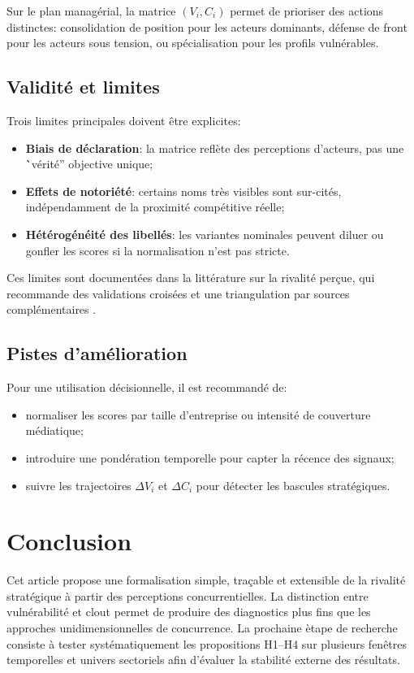 \documentclass[11pt,a4paper]{article}
\begin{document}
Sur le plan manag\'erial, la matrice $(V_i, C_i)$ permet de prioriser des actions distinctes: consolidation de position pour les acteurs dominants, d\'efense de front pour les acteurs sous tension, ou sp\'ecialisation pour les profils vuln\'erables.

\subsection*{Validit\'e et limites}
Trois limites principales doivent \^etre explicites:
\begin{itemize}
    \item \textbf{Biais de d\'eclaration}: la matrice refl\`ete des perceptions d'acteurs, pas une \``v\'erit\'e'' objective unique;
    \item \textbf{Effets de notori\'et\'e}: certains noms tr\`es visibles sont sur-cit\'es, ind\'ependamment de la proximit\'e comp\'etitive r\'eelle;
    \item \textbf{H\'et\'erog\'en\'eit\'e des libell\'es}: les variantes nominales peuvent diluer ou gonfler les scores si la normalisation n'est pas stricte.
\end{itemize}

Ces limites sont document\'ees dans la litt\'erature sur la rivalit\'e per\c cue, qui recommande des validations crois\'ees et une triangulation par sources compl\'ementaires \citep{kilduff2010,porter2008}.

\subsection*{Pistes d'am\'elioration}
Pour une utilisation d\'ecisionnelle, il est recommand\'e de:
\begin{itemize}
    \item normaliser les scores par taille d'entreprise ou intensit\'e de couverture m\'ediatique;
    \item introduire une pond\'eration temporelle pour capter la r\'ecence des signaux;
    \item suivre les trajectoires $\Delta V_i$ et $\Delta C_i$ pour d\'etecter les bascules strat\'egiques.
\end{itemize}

\section{Conclusion}
Cet article propose une formalisation simple, tra\c cable et extensible de la rivalit\'e strat\'egique \`a partir des perceptions concurrentielles. La distinction entre vuln\'erabilit\'e et clout permet de produire des diagnostics plus fins que les approches unidimensionnelles de concurrence. La prochaine \`etape de recherche consiste \`a tester syst\'ematiquement les propositions H1--H4 sur plusieurs fen\^etres temporelles et univers sectoriels afin d'\'evaluer la stabilit\'e externe des r\'esultats.



\end{document}
